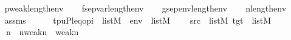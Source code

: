 \begin{isabellebody}
\ \ \isamarkupfalse%
\ {\isacharquery}{\kern0pt}p{\isacharequal}{\kern0pt}{\isachardoublequoteopen}weak{\isacharparenleft}{\kern0pt}length{\isacharparenleft}{\kern0pt}env{\isacharparenright}{\kern0pt}{\isacharcomma}{\kern0pt}{}{\isacharparenright}{\kern0pt}{\isachardoublequoteclose}\isanewline
\ \ \isamarkupfalse%
\ {\isacharquery}{\kern0pt}f{\isacharequal}{\kern0pt}{\isachardoublequoteopen}sep{\isacharunderscore}{\kern0pt}var{\isacharparenleft}{\kern0pt}length{\isacharparenleft}{\kern0pt}env{\isacharparenright}{\kern0pt}{\isacharparenright}{\kern0pt}{\isachardoublequoteclose}\isanewline
\ \ \isamarkupfalse%
\ {\isacharquery}{\kern0pt}g{\isacharequal}{\kern0pt}{\isachardoublequoteopen}sep{\isacharunderscore}{\kern0pt}env{\isacharparenleft}{\kern0pt}length{\isacharparenleft}{\kern0pt}env{\isacharparenright}{\kern0pt}{\isacharparenright}{\kern0pt}{\isachardoublequoteclose}\isanewline
\ \ \isamarkupfalse%
\ {\isacharquery}{\kern0pt}n{\isacharequal}{\kern0pt}{\isachardoublequoteopen}length{\isacharparenleft}{\kern0pt}env{\isacharparenright}{\kern0pt}{\isachardoublequoteclose}\isanewline
\ \ \isamarkupfalse%
\ assms\isanewline
\ \ \isamarkupfalse%
\ {}\ {\isacharcolon}{\kern0pt}\ {\isachardoublequoteopen}{\isacharbrackleft}{\kern0pt}t{\isacharcomma}{\kern0pt}p{\isacharcomma}{\kern0pt}u{\isacharcomma}{\kern0pt}P{\isacharcomma}{\kern0pt}leq{\isacharcomma}{\kern0pt}o{\isacharcomma}{\kern0pt}pi{\isacharbrackright}{\kern0pt}\ {\isasymin}\ list{\isacharparenleft}{\kern0pt}M{\isacharparenright}{\kern0pt}{\isachardoublequoteclose}\ {\isachardoublequoteopen}\ env\ {\isasymin}\ list{\isacharparenleft}{\kern0pt}M{\isacharparenright}{\kern0pt}{\isachardoublequoteclose}\isanewline
\ \ \ \ {\isachardoublequoteopen}{\isacharquery}{\kern0pt}src\ {\isasymin}\ list{\isacharparenleft}{\kern0pt}M{\isacharparenright}{\kern0pt}{\isachardoublequoteclose}\ {\isachardoublequoteopen}{\isacharquery}{\kern0pt}tgt\ {\isasymin}\ list{\isacharparenleft}{\kern0pt}M{\isacharparenright}{\kern0pt}{\isachardoublequoteclose}\ \ \isanewline
\ \ \ \ {\isachardoublequoteopen}{}{\isacharhash}{\kern0pt}{\isacharplus}{\kern0pt}{\isacharquery}{\kern0pt}n\ {\isacharequal}{\kern0pt}\ {\isacharparenleft}{\kern0pt}{}{\isacharhash}{\kern0pt}{\isacharplus}{\kern0pt}{\isacharquery}{\kern0pt}n{\isacharminus}{\kern0pt}weak{\isacharparenleft}{\kern0pt}{\isacharquery}{\kern0pt}n{\isacharcomma}{\kern0pt}{}{\isacharparenright}{\kern0pt}{\isacharparenright}{\kern0pt}\ {\isasymunion}\ weak{\isacharparenleft}{\kern0pt}{\isacharquery}{\kern0pt}n{\isacharcomma}{\kern0pt}{}{\isacharparenright}{\kern0pt}{\isachardoublequoteclose}\isanewline

\end{isabellebody}
